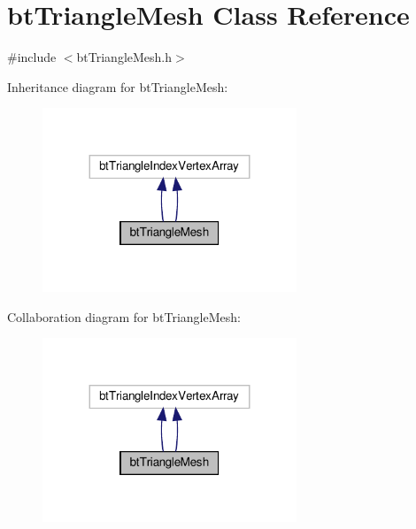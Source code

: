 \hypertarget{classbtTriangleMesh}{}\section{bt\+Triangle\+Mesh Class Reference}
\label{classbtTriangleMesh}


{\ttfamily \#include $<$bt\+Triangle\+Mesh.\+h$>$}



Inheritance diagram for bt\+Triangle\+Mesh\+:
\nopagebreak
\begin{figure}[H]
\begin{center}
\leavevmode
\includegraphics[width=215pt]{classbtTriangleMesh__inherit__graph}
\end{center}
\end{figure}


Collaboration diagram for bt\+Triangle\+Mesh\+:
\nopagebreak
\begin{figure}[H]
\begin{center}
\leavevmode
\includegraphics[width=215pt]{classbtTriangleMesh__coll__graph}
\end{center}
\end{figure}
